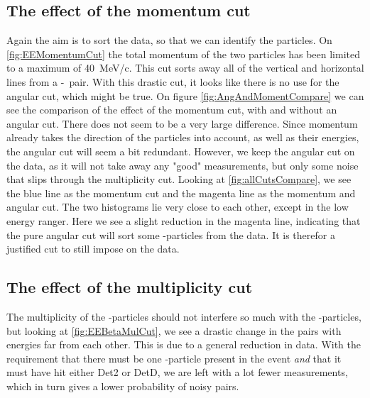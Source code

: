 \subsection{The effect of the momentum cut}
Again the aim is to sort the data, so that we can identify the particles. On \cref{fig:EEMomentumCut} the total momentum of the two particles has been limited to a maximum of \SI{40}{MeV/c}. This cut sorts away all of the vertical and horizontal lines from a \be-\al\ pair. With this drastic cut, it looks like there is no use for the angular cut, which might be true. On figure \ref{fig:AngAndMomentCompare} we can see the comparison of the effect of the momentum cut, with and without an angular cut. There does not seem to be a very large difference. Since momentum already takes the direction of the particles into account, as well as their energies, the angular cut will seem a bit redundant. However, we keep the angular cut on the data, as it will not take away any "good" measurements, but only some noise that slips through the multiplicity cut. Looking at \cref{fig:allCutsCompare}, we see the blue line as the momentum cut and the magenta line as the momentum and angular cut. The two histograms lie very close to each other, except in the low energy ranger. Here we see a slight reduction in the magenta line, indicating that the pure angular cut will sort some \be-particles from the data. It is therefor a justified cut to still impose on the data. 
 


\subsection{The effect of the multiplicity cut}
The multiplicity of the \be-particles should not interfere so much with the \al-particles, but looking at \cref{fig:EEBetaMulCut}, we see a drastic change in the pairs with energies far from each other. This is due to a general reduction in data. With the requirement that there must be one \be-particle present in the event \textit{and} that it must have hit either Det2 or DetD, we are left with a lot fewer measurements, which in turn gives a lower probability of noisy pairs. 

